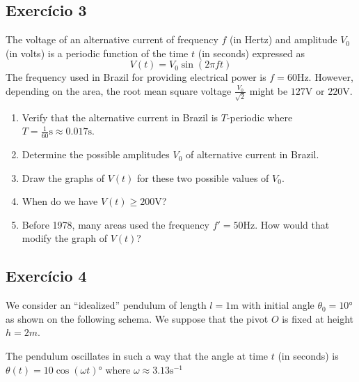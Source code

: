 
\subsection*{Exercício 3}

The voltage of an alternative current of frequency $f$ (in Hertz) and amplitude
$V_0$ (in volts) is a periodic function of the time $t$ (in seconds)
expressed as
$$
{V(t)} = V_0 \sin\left(2 \pi f t\right)
$$
The frequency used in Brazil for providing electrical power is
$f = 60\text{Hz}$. However, depending on the area, the root mean square voltage
$\frac{V_0}{\sqrt{2}}$ might be $127\text{V}$ or $220\text{V}$.

\begin{enumerate}
\item Verify that the alternative current in Brazil is $T$-periodic where
  $T = \frac{1}{60} \text{s} \approx 0.017\text{s}$.
\item Determine the possible amplitudes $V_0$ of alternative current in Brazil.
\item Draw the graphs of $V(t)$ for these two possible values of $V_0$.
\item When do we have $V(t) \geq 200 \text{V}$?
\item Before 1978, many areas used the frequency $f' = 50\text{Hz}$. How would
  that modify the graph of $V(t)$?
\end{enumerate}

\subsection*{Exercício 4}

We consider an ``idealized'' pendulum of length $l=1\text{m}$ with initial angle
$\theta_0 = 10°$ as shown on the following schema.
We suppose that the pivot $O$ is fixed at height $h = 2m$.

\begin{center}
\end{center}

The pendulum oscillates in such a way that the angle at time $t$ (in
seconds) is $\theta{(t)} = 10 \cos\left(\omega t\right)°$ where
$\omega \approx 3.13 \text{s}^{-1}$


